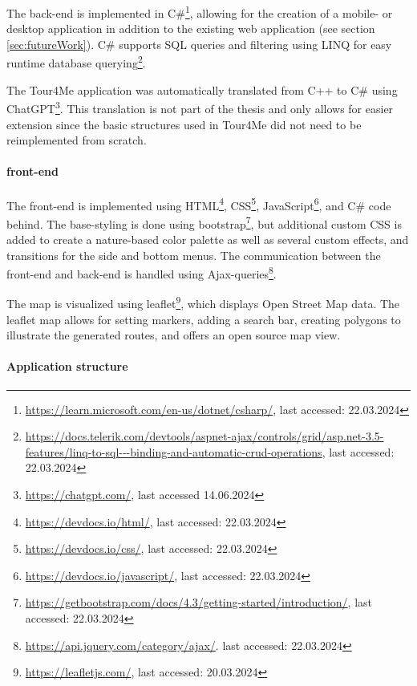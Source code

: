 The back-end is implemented in C\#\footnote{\url{https://learn.microsoft.com/en-us/dotnet/csharp/}, last accessed: 22.03.2024}, allowing for the creation of a mobile- or desktop application in addition to the existing web application (see section \ref{sec:futureWork}).
C\# supports SQL queries and filtering using LINQ for easy runtime database querying\footnote{\url{https://docs.telerik.com/devtools/aspnet-ajax/controls/grid/asp.net-3.5-features/linq-to-sql---binding-and-automatic-crud-operations}, last accessed: 22.03.2024}.

The Tour4Me application was automatically translated from C++ to C\# using ChatGPT\footnote{\url{https://chatgpt.com/}, last accessed 14.06.2024}. 
This translation is not part of the thesis and only allows for easier extension since the basic structures used in Tour4Me did not need to be reimplemented from scratch.

\paragraph{front-end}

The front-end is implemented using HTML\footnote{\url{https://devdocs.io/html/}, last accessed: 22.03.2024}, CSS\footnote{\url{https://devdocs.io/css/}, last accessed: 22.03.2024}, JavaScript\footnote{\url{https://devdocs.io/javascript/}, last accessed: 22.03.2024}, and C\# code behind. 
The base-styling is done using bootstrap\footnote{\url{https://getbootstrap.com/docs/4.3/getting-started/introduction/}, last accessed: 22.03.2024}, but additional custom CSS is added to create a nature-based color palette as well as several custom effects, and transitions for the side and bottom menus.
The communication between the front-end and back-end is handled using  Ajax-queries\footnote{\url{https://api.jquery.com/category/ajax/}. last accessed: 22.03.2024}.

The map is visualized using leaflet\footnote{\url{https://leafletjs.com/}, last accessed: 20.03.2024}, which displays Open Street Map data.
The leaflet map allows for setting markers, adding a search bar, creating polygons to illustrate the generated routes, and offers an open source map view. 

\paragraph{Application structure}

